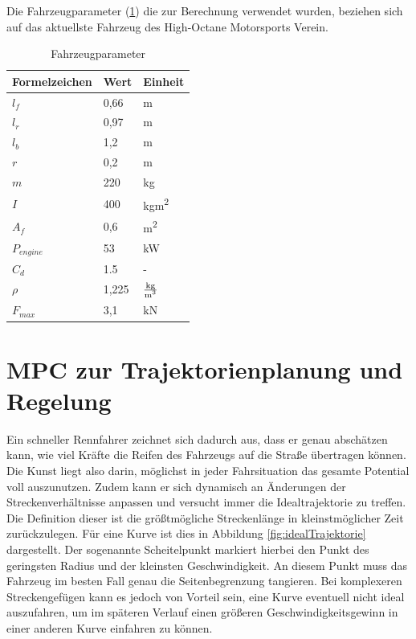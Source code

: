 \documentclass{like}
\begin{document}
Die Fahrzeugparameter (\ref{vehicleParam}) die zur Berechnung verwendet wurden, beziehen sich auf das aktuellste Fahrzeug des High-Octane Motorsports Verein.

\begin{table}[ht!]
	\centering
	\caption{Fahrzeugparameter}
	\begin{tabular}{l|l|l}
		\hline
		Formelzeichen	& Wert & Einheit \\ \hline
		\(l_f\)	&	0,66 & m\\
		\(l_r\)	&	0,97 & m\\
		\(l_b\)	&	1,2 & m \\
		\(r\)	&	0,2 & m \\
		\(m\)	&  	220 & kg\\
		\(I\)	&  	400 & kgm\textsuperscript{2}\\
		\(A_f\)	&  	0,6 & m\textsuperscript{2}\\
		\(P_{engine}\) &  53 & kW\\
		\(C_d\)	&  	1.5 & - \\
		\(\rho\)	&  	1,225 & $\frac{\text{kg}}{\text{m\textsuperscript{3}}}$\\
		\(F_{max}\)	&  	3,1 & kN \\ 
	\end{tabular}
	\label{vehicleParam}
\end{table}



\chapter{MPC zur Trajektorienplanung und Regelung}
\label{MPCControlling}

Ein schneller Rennfahrer zeichnet sich dadurch aus, dass er genau abschätzen kann, wie viel Kräfte die Reifen des Fahrzeugs auf die Straße übertragen können. Die Kunst liegt also darin, möglichst in jeder Fahrsituation das gesamte Potential voll auszunutzen. Zudem kann er sich dynamisch an Änderungen der Streckenverhältnisse anpassen und versucht immer die Idealtrajektorie zu treffen. Die Definition dieser ist die größtmögliche Streckenlänge in kleinstmöglicher Zeit zurückzulegen. Für eine Kurve ist dies in Abbildung \ref{fig:idealTrajektorie} dargestellt. Der sogenannte Scheitelpunkt markiert hierbei den Punkt des geringsten Radius und der kleinsten Geschwindigkeit. An diesem Punkt muss das Fahrzeug im besten Fall genau die Seitenbegrenzung tangieren. 
Bei komplexeren Streckengefügen kann es jedoch von Vorteil sein, eine Kurve eventuell nicht ideal auszufahren, um im späteren Verlauf einen größeren Geschwindigkeitsgewinn in einer anderen Kurve einfahren zu können.
\end{document}
